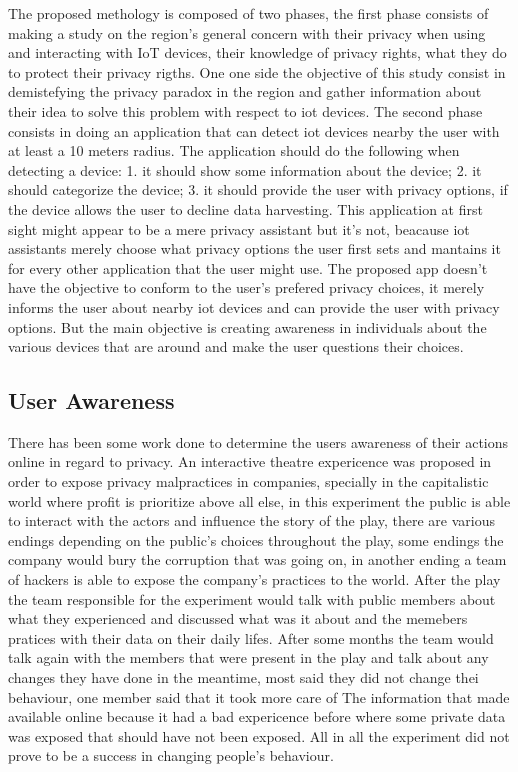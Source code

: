 \documentclass[conference]{IEEEtran}
\begin{document}
The proposed methology is composed of two phases, the first phase consists of
making a study on the region's general concern with their privacy when
using and interacting with IoT devices, their knowledge of privacy rights, what they do to
protect their privacy rigths. One one side the objective of this study
consist in demistefying the privacy paradox in the region and gather
information about their idea to solve this problem with respect
to iot devices.
The second phase consists in doing an application that can detect iot devices
nearby the user with at least a 10 meters radius. The application should
do the following when detecting a device:
1. it should show some information about the device;
2. it should categorize the device;
3. it should provide the user with privacy options, if the device allows the
user to decline data harvesting.
This application at first sight might appear to be a mere privacy assistant but
it's not, beacause iot assistants merely choose what privacy options
the user first sets and mantains it for every other application that the user
might use. The proposed app doesn't have the objective to conform to the
user's prefered privacy choices, it merely informs the user about nearby iot
devices and can provide the user with privacy options. But the main objective
is creating awareness in individuals about the various devices that are around
and make the user questions their choices.

\subsection{User Awareness}\label{AA}
There has been some work done to determine the users awareness of
their actions online in regard to privacy. An interactive theatre expericence \cite{ColnagoInforming}
was proposed in order to expose privacy malpractices in companies,
specially in the capitalistic world where profit is prioritize
above all else, in this experiment the public is able to interact with
the actors and influence the story of the play, there are various endings depending
on the public's choices throughout the play, some endings the company would
bury the corruption that was going on, in another ending a team of hackers
is able to expose the company's practices to the world. After the play
the team responsible for the experiment would talk with public members about
what they experienced and discussed what was it about and the memebers
pratices with their data on their daily lifes. After some months
the team would talk again with the members that were present in the play and
talk about any changes they have done in the meantime, most said they did 
not change thei behaviour, one member said that it took more care of The
information that made available online because it had a bad expericence before
where some private data was exposed that should have not been exposed. All in 
all the experiment did not prove to be a success in changing people's behaviour.
\end{document}
